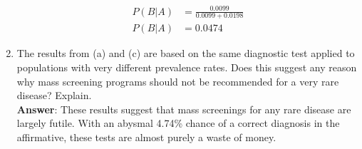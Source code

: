 \documentclass{article}
\begin{document}
\begin{enumerate}[\ \ (a)\ ]
\begin{align*}
				P(B|A) &= \frac{0.0099}{0.0099+0.0198}\\
				P(B|A) &= 0.0474
				\end{align*}
				\item The results from (a) and (c) are based on the same diagnostic test applied to populations with very different prevalence rates. Does this suggest any reason why mass screening programs should not be recommended for a very rare disease? Explain.\\
				\textbf{Answer}:  These results suggest that mass screenings for any rare disease are largely futile. With an abysmal 4.74\% chance of a correct diagnosis in the affirmative, these tests are almost purely a waste of money.
			\end{enumerate}
	
\end{document}
